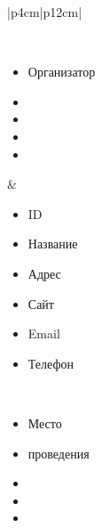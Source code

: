 \begin{table}[h!]
\begin{center}
\begin{threeparttable}
\begin{tabular}{|p{4cm}|p{12cm}|}
\begin{minipage}[t]{\linewidth}
\begin{multicols}{2}
\begin{itemize}[labelsep=0mm,nosep,after=\strut]
                \end{itemize}
              \end{multicols}
            \end{minipage}\\
            \hline
            \begin{minipage}[t]{\linewidth}
              \begin{multicols}{1}
                \begin{itemize}[labelsep=0mm,nosep,after=\strut]
                  \item[] Организатор
                  \item[]
                  \item[]
                  \item[]
                  \item[]
                \end{itemize}
              \end{multicols}
            \end{minipage}
          & \begin{minipage}[t]{\linewidth}
              \begin{multicols}{2}
                \begin{itemize}[labelsep=0mm,nosep,after=\strut]
                  \item[] ID
                  \item[] Название
                  \item[] Адрес
                  \item[] Сайт
                  \item[] Email
                  \item[] Телефон
                \end{itemize}
              \end{multicols}
            \end{minipage}\\
            \hline
            \begin{minipage}[t]{\linewidth}
              \begin{multicols}{1}
                \begin{itemize}[labelsep=0mm,nosep,after=\strut]
                  \item[] Место 
                  \item[] проведения
                  \item[]
                  \item[]
                  \item[]

\end{itemize}
\end{multicols}
\end{minipage}
\end{tabular}
\end{threeparttable}
\end{center}
\end{table}
